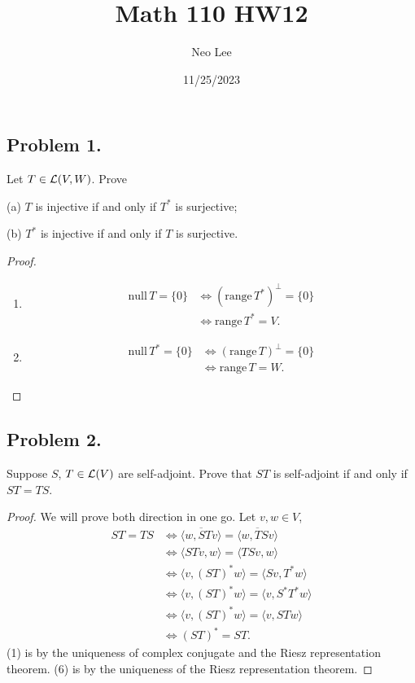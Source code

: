 \documentclass{article}
\title{Math 110 HW12}
\author{Neo Lee}
\date{11/25/2023}
\newcommand*{\range}{\ensuremath{\mathrm{range}}\,}
\newcommand*{\nul}{\ensuremath{\mathrm{null}}\,}
\begin{document}
 

\maketitle 

\subsection*{Problem 1.}
Let $T\in {\cal L} (V,W)$. Prove
\begin{description}
\item{(a)} $T$ is injective if and only if $T^*$ is surjective;
\item{(b)} $T^*$ is injective if and only if $T$ is surjective.
\end{description}
\begin{proof}\indent
    \begin{enumerate}[label=(\alph*)]
        \item
        \begin{align*}
            \nul T = \{0\} & \iff (\range T^*)^\perp = \{0\} \\
            & \iff \range T^* = V.
        \end{align*}

        \item
        \begin{align*}
            \nul T^* = \{0\} & \iff (\range T)^\perp = \{0\} \\
            & \iff \range T = W.
        \end{align*}
    \end{enumerate}
\end{proof}

\newpage
\subsection*{Problem 2.}
Suppose $S$, $T \in {\cal L}(V)$ are self-adjoint.  Prove that $ST$ is self-adjoint if and only if $ST=TS$.
\begin{proof}
    We will prove both direction in one go. Let $v, w\in V$,
    \begin{align}
        ST = TS & \iff \overline{\langle w, STv\rangle} = \overline{\langle w, TSv\rangle} \\
        & \iff \langle STv, w\rangle = \langle TSv, w\rangle \\
        & \iff \langle v, (ST)^*w \rangle = \langle Sv, T^*w\rangle \\
        & \iff \langle v, (ST)^*w \rangle = \langle v, S^*T^*w\rangle \\
        & \iff \langle v, (ST)^*w\rangle = \langle v, STw\rangle \\
        & \iff (ST)^* = ST.
    \end{align}
    (1) is by the uniqueness of complex conjugate and the Riesz representation theorem. 
    (6) is by the uniqueness of the Riesz representation theorem.
\end{proof}
\end{document}
